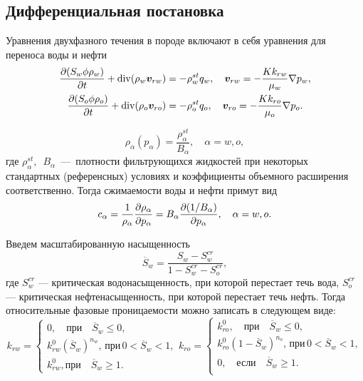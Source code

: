 \subsection{Дифференциальная постановка}
Уравнения двухфазного течения в породе включают в себя уравнения для переноса воды и нефти
\begin{equation}\label{eq:egor_common_equation_multiphase_rho}
\begin{split}
	\dfrac{\partial (S_w \phi \rho_w)}{\partial t} + \operatorname{div}(\rho_w \bm{v}_{rw})    &= - \rho^{st}_w q_w, \quad \bm{v}_{rw}=-\frac{K k_{rw}}{\mu_w}\nabla p_w,\\
	\dfrac{\partial (S_o \phi \rho_o)}{\partial t} + \operatorname{div}(\rho_o \bm{v}_{ro})  &= - \rho^{st}_o q_o, \quad \bm{v}_{ro}=-\frac{K k_{ro}}{\mu_o}\nabla p_o.
\end{split}
\end{equation}

$$
\rho_\alpha(p_\alpha) = \frac{\rho^{st}_\alpha}{B_\alpha}, \quad \alpha = w,o,
$$
где $\rho^{st}_\alpha,$~$B_\alpha$~---~плотности фильтрующихся жидкостей при некоторых стандартных (референсных) условиях и  коэффициенты объемного расширения соответственно. 
Тогда сжимаемости воды и нефти примут вид 
\begin{equation}\label{eq:sibin_c_alpha}
c_\alpha = \frac{1}{\rho_\alpha} \dfrac{\partial \rho_\alpha}{\partial p_\alpha} = B_\alpha \dfrac{\partial (1 / B_\alpha)}{\partial p_\alpha}, \quad \alpha = w,o.
\end{equation}

Введем масштабированную насыщенность
\begin{equation}\label{eq:star:mod:Sw}
 \overline {S}_w= \frac{S_w-S_w^{cr}}{1-S_w^{cr}-S_o^{cr}},
\end{equation}
где $S_w^{cr}$ --- критическая водонасыщенность, при которой перестает течь вода, $S_o^{cr}$ --- критическая нефтенасыщенность, при которой перестает течь нефть. Тогда относительные фазовые проницаемости можно записать в следующем виде:
\begin{equation}\label{eq:star:mod:RelatPerm}
	k_{rw}= \begin{cases}
	0, \quad \text{при}\quad \overline {S}_w \leq 0,\\
	k_{rw}^0 (\overline {S}_w)^{n_w}, \,\text{при}\,0<\overline {S}_w <1, \\
	k_{rw}^0, \text{при}\quad \overline {S}_w \geq 1.
   \end{cases}
   k_{ro}=\begin{cases}
	k_{ro}^0, \quad \text{при}\quad \overline {S}_w \leq 0, \\
	k_{ro}^0 (1-\overline {S}_w)^{n_o}, \, \text{при}\,0<\overline {S}_w<1 , \\
   0, \quad \text{если}\quad \overline {S}_w \geq 1.\\
   \end{cases}
\end{equation}

